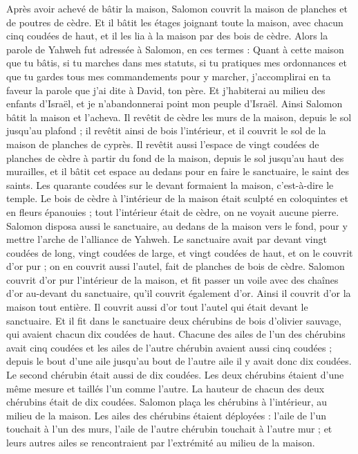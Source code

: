 \begin{multicols}{2}
Après avoir achevé de bâtir la maison, Salomon couvrit la maison de planches et de poutres de cèdre.
Et il bâtit les étages joignant toute la maison, avec chacun cinq coudées de haut, et il les lia à la maison par des bois de cèdre.
Alors la parole de Yahweh fut adressée à Salomon, en ces termes :
Quant à cette maison que tu bâtis, si tu marches dans mes statuts, si tu pratiques mes ordonnances et que tu gardes tous mes commandements pour y marcher, j’accomplirai en ta faveur la parole que j'ai dite à David, ton père.
Et j'habiterai au milieu des enfants d'Israël, et je n'abandonnerai point mon peuple d'Israël.
Ainsi Salomon bâtit la maison et l'acheva.
Il revêtit de cèdre les murs de la maison, depuis le sol jusqu'au plafond ; il revêtit ainsi de bois l’intérieur, et il couvrit le sol de la maison de planches de cyprès.
Il revêtit aussi l'espace de vingt coudées de planches de cèdre à partir du fond de la maison, depuis le sol jusqu'au haut des murailles, et il bâtit cet espace au dedans pour en faire le sanctuaire, le saint des saints.
Les quarante coudées sur le devant formaient la maison, c’est-à-dire le temple.
Le bois de cèdre à l’intérieur de la maison était sculpté en coloquintes et en fleurs épanouies ; tout l’intérieur était de cèdre, on ne voyait aucune pierre.
Salomon disposa aussi le sanctuaire, au dedans de la maison vers le fond, pour y mettre l'arche de l'alliance de Yahweh.
Le sanctuaire avait par devant vingt coudées de long, vingt coudées de large, et vingt coudées de haut, et on le couvrit d’or pur ; on en couvrit aussi l'autel, fait de planches de bois de cèdre.
Salomon couvrit d’or pur l’intérieur de la maison, et fit passer un voile avec des chaînes d'or au-devant du sanctuaire, qu’il couvrit également d'or.
Ainsi il couvrit d'or la maison tout entière. Il couvrit aussi d'or tout l'autel qui était devant le sanctuaire.
Et il fit dans le sanctuaire deux chérubins de bois d'olivier sauvage, qui avaient chacun dix coudées de haut.
Chacune des ailes de l'un des chérubins avait cinq coudées et les ailes de l’autre chérubin avaient aussi cinq coudées ; depuis le bout d'une aile jusqu'au bout de l'autre aile il y avait donc dix coudées.
Le second chérubin était aussi de dix coudées. Les deux chérubins étaient d'une même mesure et taillés l'un comme l'autre.
La hauteur de chacun des deux chérubins était de dix coudées.
Salomon plaça les chérubins à l’intérieur, au milieu de la maison. Les ailes des chérubins étaient déployées : l'aile de l'un touchait à l’un des murs, l'aile de l'autre chérubin touchait à l'autre mur ; et leurs autres ailes se rencontraient par l’extrémité au milieu de la maison.

\end{multicols}

